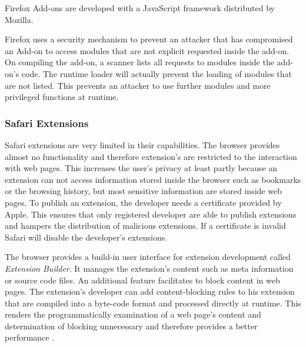 	
	
	Firefox Add-ons are developed with a JavaScript framework distributed by Mozilla. 
	
	
	
	
	Firefox uses a security mechanism to prevent an attacker that has compromised an Add-on to access modules that are not explicit requested inside the add-on. On compiling the add-on, a scanner lists all requests to modules inside the add-on's code. The runtime loader will actually prevent the loading of modules that are not listed. This prevents an attacker to use further modules and more privileged functions at runtime.
	
	

\subsubsection{Safari Extensions}

	Safari extensions are very limited in their capabilities. The browser provides almost no functionality and therefore extension's are restricted to the interaction with web pages. This increases the user's privacy at least partly because an extension can not access information stored inside the browser such as bookmarks or the browsing history, but most sensitive information are stored inside web pages. To publish an extension, the developer needs a certificate provided by Apple. This ensures that only registered developer are able to publish extensions and hampers the distribution of malicious extensions. If a certificate is invalid Safari will disable the developer's extensions.
	
	The browser provides a build-in user interface for extension development called \textit{Extension Builder}. It manages the extension's content such as meta information or source code files.	An additional feature facilitates to block content in web pages. The extension's developer can add content-blocking rules to his extension that are compiled into a byte-code format and processed directly at runtime. This renders the programmatically examination of a web page's content and determination of blocking unnecessary and therefore provides a better performance \cite{safariContentBlockingRules}.  